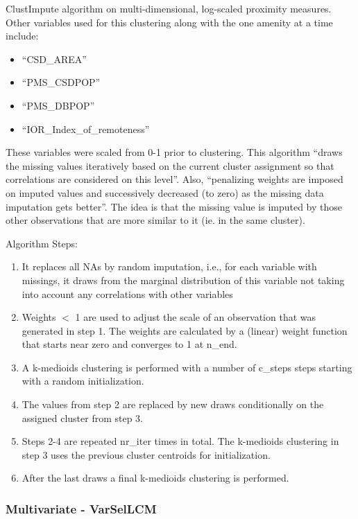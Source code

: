 \documentclass[11pt, a4paper]{article}
\begin{document}
ClustImpute algorithm on multi-dimensional, log-scaled proximity measures. Other variables used for this clustering along with the one amenity at a time include:
\begin{itemize}
\item ``CSD\_AREA''
\item ``PMS\_CSDPOP''
\item ``PMS\_DBPOP''
\item ``IOR\_Index\_of\_remoteness''
\end{itemize}

These variables were scaled from 0-1 prior to clustering.
This algorithm ``draws the missing values iteratively based on the current cluster assignment so that correlations are considered on this level''. Also, ``penalizing weights are imposed on imputed values and successively decreased (to zero) as the missing data imputation gets better''. The idea is that the missing value is imputed by those other observations that are more similar to it (ie. in the same cluster).
\par
Algorithm Steps:
\begin{enumerate}
\item It replaces all NAs by random imputation, i.e., for each variable with missings, it draws from the marginal distribution of this variable not taking into account any correlations with other variables
\item Weights $<$ 1 are used to adjust the scale of an observation that was generated in step 1. The weights are calculated by a (linear) weight function that starts near zero and converges to 1 at n\_end.
\item A k-medioids clustering is performed with a number of c\_steps steps starting with a random initialization.
\item The values from step 2 are replaced by new draws conditionally on the assigned cluster from step 3.
\item Steps 2-4 are repeated nr\_iter times in total. The k-medioids clustering in step 3 uses the previous cluster centroids for initialization.
\item After the last draws a final k-medioids clustering is performed.
\end{enumerate}






\subsubsection{Multivariate - VarSelLCM}
\end{document}
